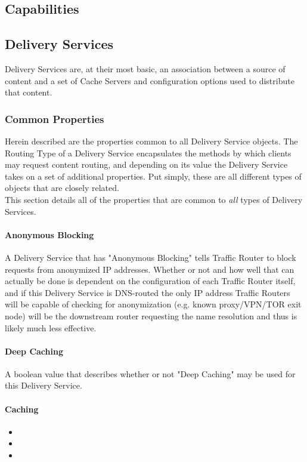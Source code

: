 \subsection{Capabilities}


\subsection{Delivery Services}
Delivery Services are, at their most basic, an association between a source of
content and a set of Cache Servers and configuration options used to distribute
that content.

\subsubsection{Common Properties}
Herein described are the properties common to all Delivery Service objects. The
Routing Type of a Delivery Service encapsulates the methods by which clients
may request content routing, and depending on its value the Delivery Service
takes on a set of additional properties. Put simply, these are all different
types of objects that are closely related.\\
This section details all of the properties that are common to \emph{all} types
of Delivery Services.

\paragraph{Anonymous Blocking}
A Delivery Service that has "Anonymous Blocking" tells Traffic Router to block
requests from anonymized IP addresses. Whether or not and how well that can
actually be done is dependent on the configuration of each Traffic Router
itself, and if this Delivery Service is DNS-routed the only IP address Traffic
Routers will be capable of checking for anonymization (e.g. known proxy/VPN/TOR
exit node) will be the downstream router requesting the name resolution and thus
is likely much less effective.

\paragraph{Deep Caching}
A boolean value that describes whether or not "Deep Caching" may be used for
this Delivery Service.

\paragraph{Caching}
\begin{itemize}
	\item {}
	\item {}
	\item {}
\end{itemize}


